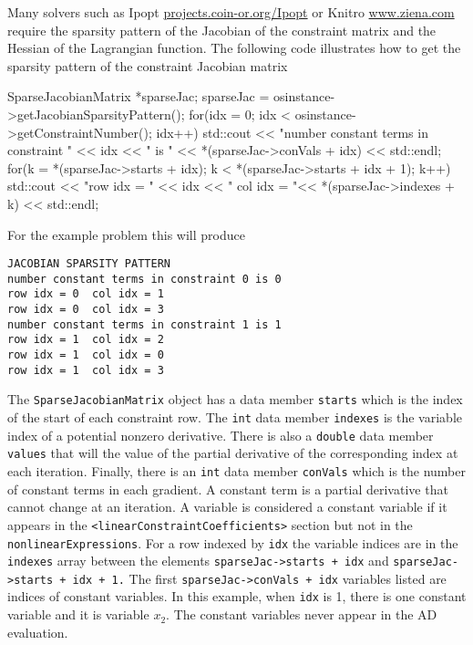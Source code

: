 \documentclass[11pt]{article}
\renewcommand{\_}{{\char"5F}}
\renewcommand{\{}{{\char"7B}}
\renewcommand{\}}{{\char"7D}}
\renewcommand{\^}{{\char"0D}}
\renewcommand{\'}{{\char"0D}}
\begin{document}
Many  solvers such as Ipopt \url{projects.coin-or.org/Ipopt} or Knitro \url{www.ziena.com} require the sparsity pattern of the Jacobian of the constraint matrix and the Hessian of the Lagrangian function. The following code illustrates how to get the sparsity pattern of the constraint Jacobian matrix
\begin{verbatimtab}[4]
SparseJacobianMatrix *sparseJac;
sparseJac = osinstance->getJacobianSparsityPattern();
for(idx = 0; idx < osinstance->getConstraintNumber(); idx++){
	std::cout << "number constant terms in constraint "   <<  idx << " is " 
	<< *(sparseJac->conVals + idx)  << std::endl;
	for(k = *(sparseJac->starts + idx); k < *(sparseJac->starts + idx + 1); k++){
		std::cout << "row idx = " << idx <<  "  
		col idx = "<< *(sparseJac->indexes + k) << std::endl;
	}
}
\end{verbatimtab}
For the example problem this will produce
\begin{verbatim}
JACOBIAN SPARSITY PATTERN
number constant terms in constraint 0 is 0
row idx = 0  col idx = 1
row idx = 0  col idx = 3
number constant terms in constraint 1 is 1
row idx = 1  col idx = 2
row idx = 1  col idx = 0
row idx = 1  col idx = 3
\end{verbatim}
The {\tt SparseJacobianMatrix} object has a data member {\tt starts} which is the index of the start of each constraint row. The {\tt int} data member {\tt indexes} is the variable index of a potential nonzero derivative. There is also a {\tt double} data member  {\tt values} that will the value of the partial derivative of the corresponding index at each iteration. Finally, there is an {\tt int} data member {\tt conVals} which is the number of constant terms in each gradient. A constant term is a partial derivative that cannot change at an iteration.  A variable is considered a constant variable if it appears in the {\tt <linearConstraintCoefficients>} section  but not in the {\tt nonlinearExpressions}.  For a row indexed by {\tt idx} the variable indices are in the  {\tt indexes} array between the elements {\tt sparseJac->starts + idx} and {\tt sparseJac->starts + idx + 1.}   The first  {\tt sparseJac->conVals + idx} variables listed are indices of constant variables. In this example, when {\tt idx} is 1, there is one constant variable and it is variable $x_{2}.$  The constant variables never appear in the AD evaluation. 
\end{document}
